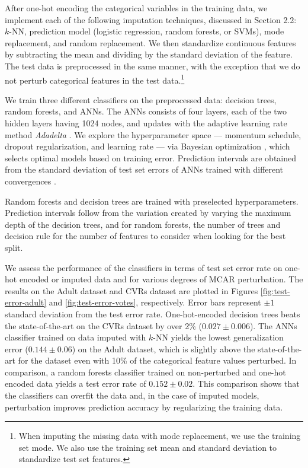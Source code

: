 \documentclass[10pt]{book}
\theoremstyle{definition}
\begin{document}
After one-hot encoding the categorical variables in the training data, we implement each of the following imputation techniques, discussed in Section 2.2: $k$-NN, prediction model (logistic regression, random forests, or SVMs), mode replacement, and random replacement. We then standardize continuous features by subtracting the mean and dividing by the standard deviation of the feature. The test data is preprocessed in the same manner, with the exception that we do not perturb categorical features in the test data.\footnote{When imputing the missing data with mode replacement, we use the training set mode. We also use the training set mean and standard deviation to standardize test set features.\nocite{rubin1995}}

\par
{}

We train three different classifiers on the preprocessed data: decision trees, random forests, and ANNs. The ANNs consists of four layers, each of the two hidden layers having 1024 nodes, and updates with the adaptive learning rate method \emph{Adadelta} \citep{zeiler2012}. We explore the hyperparameter space ---  momentum schedule, dropout regularization, and learning rate --- via Bayesian optimization \citep{snoek2012}, which selects optimal models based on training error. Prediction intervals are obtained from the standard deviation of test set errors of ANNs trained with different convergences \citep{heskes1997}. 

Random forests and decision trees are trained with preselected hyperparameters. Prediction intervals follow from the variation created by varying the maximum depth of the decision trees, and for random forests, the number of trees and decision rule for the number of features to consider when looking for the best split. 

\par
{}

We assess the performance of the classifiers in terms of test set error rate on one-hot encoded or imputed data and for various degrees of MCAR perturbation. The results on the Adult dataset and CVRs dataset are plotted in Figures \ref{fig:test-error-adult} and \ref{fig:test-error-votes}, respectively. Error bars represent $\pm 1$ standard deviation from the test error rate. One-hot-encoded decision trees beats the state-of-the-art on the CVRs dataset by over 2\% ($0.027 \pm 0.006$). The ANNs classifier trained on data imputed with $k$-NN yields the lowest generalization error ($0.144 \pm 0.06$) on the Adult dataset, which is slightly above the state-of-the-art for the dataset even with 10\% of the categorical feature values perturbed. In comparison, a random forests classifier trained on non-perturbed and one-hot encoded data yields a test error rate of $0.152 \pm 0.02$. This comparison shows that the classifiers can overfit the data and, in the case of imputed models, perturbation improves prediction accuracy by regularizing the training data. 
\end{document}
